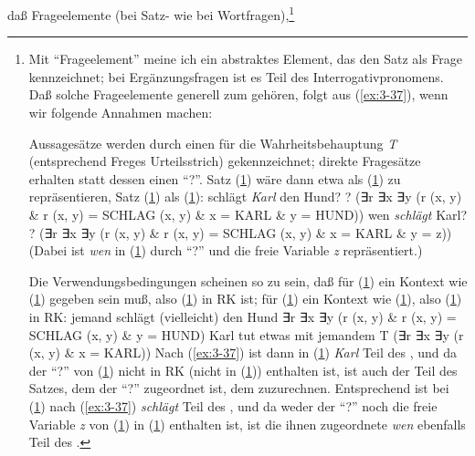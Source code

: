 \documentclass[output=paper]{langsci/langscibook}
\begin{document}
daß Frageelemente (bei Satz- wie bei Wortfragen),\footnote{\label{fn:3-12a}%
  Mit "`Frageelement"' meine ich ein abstraktes Element, das den Satz als
  Frage kennzeichnet; bei Ergänzungsfragen ist es Teil des
  Interrogativpronomens. Daß solche Frageelemente generell zum 
  gehören, folgt aus (\ref{ex:3-37}), wenn wir folgende Annahmen machen:

  Aussagesätze werden durch einen  für die Wahrheitsbehauptung \emph{T}
  (entsprechend Freges Urteilsstrich) gekennzeichnet; direkte Fragesätze
  erhalten statt dessen einen  "`?"'. Satz (\ref{ex:3-fn12aia}) wäre dann etwa
  als (\ref{ex:3-fn12aib}) zu repräsentieren, Satz (\ref{ex:3-fn12aiia}) als (\ref{ex:3-fn12aiib}):
  \eal
  \label{ex:3-fn12ai}
  \ex
  \label{ex:3-fn12aia}
  schlägt \textit{Karl} den Hund?
  \ex
  \label{ex:3-fn12aib}
  ? (∃r ∃x ∃y (r (x, y) \& r (x, y) = SCHLAG (x, y) \& x = KARL \& y = HUND))
  \zlmid
  \eal
  \label{ex:3-fn12aii}
  \ex
  \label{ex:3-fn12aiia}
  wen \textit{schlägt} Karl?
  \ex
  \label{ex:3-fn12aiib}
  ? (∃r ∃x ∃y (r (x, y) \& r (x, y) = SCHLAG (x, y) \& x = KARL \& y = z))
  \zl
  (Dabei ist \textit{wen} in (\ref{ex:3-fn12aiib}) durch "`?"' und die freie Variable \textit{z} repräsentiert.)

  Die Verwendungsbedingungen scheinen so zu sein, daß für (\ref{ex:3-fn12aia}) ein
  Kontext wie (\ref{ex:3-fn12aiiia}) gegeben sein muß, also (\ref{ex:3-fn12aiiib}) in RK ist; für
  (\ref{ex:3-fn12aiia}) ein Kontext wie (\ref{ex:3-fn12aiva}), also (\ref{ex:3-fn12aivb}) in RK:
  \eal
  \label{ex:3-fn12aiii}
  \ex
  \label{ex:3-fn12aiiia}
  jemand schlägt (vielleicht) den Hund
  \ex
  \label{ex:3-fn12aiiib}
  ∃r ∃x ∃y (r (x, y) \& r (x, y) = SCHLAG (x, y) \& y = HUND)
  \zlmid
  \eal
  \label{ex:3-fn12aiv}
  \ex
  \label{ex:3-fn12aiva}
  Karl tut etwas mit jemandem
  \ex
  \label{ex:3-fn12aivb}
  T (∃r ∃x ∃y (r (x, y) \& x = KARL))
  \zl
  Nach (\ref{ex:3-37}) ist dann in (\ref{ex:3-fn12aia}) \textit{Karl} Teil des , und da der 
  "`?"' von (\ref{ex:3-fn12aib}) nicht in RK (\dash nicht in (\ref{ex:3-fn12aiiib})) enthalten ist, ist
  auch der Teil des Satzes, dem der  "`?"' zugeordnet ist, dem
   zuzurechnen. Entsprechend ist bei (\ref{ex:3-fn12aiia}) nach (\ref{ex:3-37}) \textit{schlägt}
  Teil des , und da weder der  "`?"' noch die freie Variable
  \textit{z} von (\ref{ex:3-fn12aiib}) in (\ref{ex:3-fn12aivb}) enthalten ist, ist die ihnen zugeordnete
   \textit{wen} ebenfalls Teil des .%
}
\end{document}
